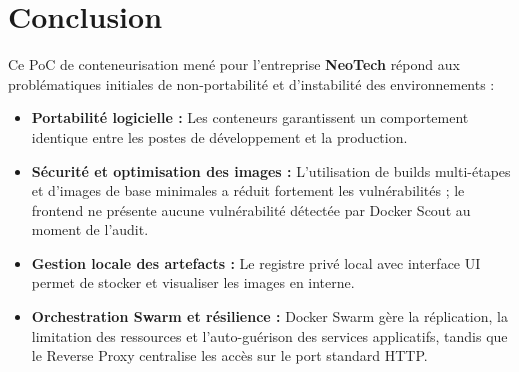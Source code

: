 \documentclass[11pt,a4paper]{article}
\begin{document}
\section{Conclusion}
Ce PoC de conteneurisation mené pour l'entreprise \textbf{NeoTech} répond aux problématiques initiales de non-portabilité et d'instabilité des environnements :
\begin{itemize}
  \item \textbf{Portabilité logicielle :} Les conteneurs garantissent un comportement identique entre les postes de développement et la production.
  \item \textbf{Sécurité et optimisation des images :} L'utilisation de builds multi-étapes et d'images de base minimales a réduit fortement les vulnérabilités ; le frontend ne présente aucune vulnérabilité détectée par Docker Scout au moment de l'audit.
  \item \textbf{Gestion locale des artefacts :} Le registre privé local avec interface UI permet de stocker et visualiser les images en interne.
  \item \textbf{Orchestration Swarm et résilience :} Docker Swarm gère la réplication, la limitation des ressources et l'auto-guérison des services applicatifs, tandis que le Reverse Proxy centralise les accès sur le port standard HTTP.
\end{itemize}
\end{document}
